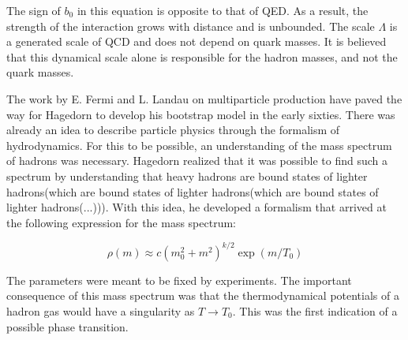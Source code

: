 The sign of $b_0$ in this equation is opposite to that of QED. As a result, the strength of the interaction grows with distance and is unbounded. The scale $\Lambda$ is a generated scale of QCD and does not depend on quark masses. It is believed that this dynamical scale alone is responsible for the hadron masses, and not the quark masses.

\mysection{\qgp} \label{qgp}

The work by E. Fermi\cite{fermi_high-energy_1950} and L. Landau\cite{lifshitz_statistical_1980,haar_collected_2013} on multiparticle production have paved the way for Hagedorn to develop his bootstrap model in the early sixties. There was already an idea to describe particle physics through the formalism of hydrodynamics. For this to be possible, an understanding of the mass spectrum of hadrons was necessary. Hagedorn realized that it was possible to find such a spectrum by understanding that heavy hadrons are bound states of lighter hadrons(which are bound states of lighter hadrons(which are bound states of lighter hadrons(...))). With this idea, he developed a formalism that arrived at the following expression for the mass spectrum:

\begin{equation}
\rho(m) \approx c(m_0^2 + m^2)^{k/2} \exp(m/T_0)
\end{equation}

The parameters were meant to be fixed by experiments. The important consequence of this mass spectrum was that the thermodynamical potentials of a hadron gas would have a singularity as $T \rightarrow T_0$. This was the first indication of a possible phase transition.

